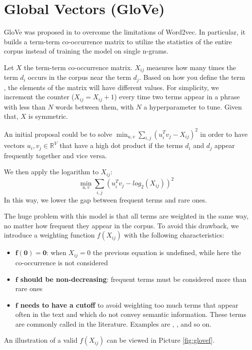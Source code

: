 \section{Global Vectors (GloVe)}

GloVe was proposed in \cite{pennington2014glove} to overcome the limitations of Word2vec.
In particular, it builds a term-term co-occurrence matrix
to utilize the statistics of the entire corpus
instead of training the model on single n-grams.

Let  $X$ the term-term co-occurrence matrix.
$X_{ij}$ measures how many times the term $d_i$ occurs in the corpus near
the term $d_j$. Based on how you define the term ,
the elements of the matrix will have different values.
For simplicity, we increment the counter ($X_{ij} = X_{ij} + 1$) every time
two terms appear in a phrase with less than $N$ words between them, with $N$ a
hyperparameter to tune. Given that, $X$ is symmetric.

An initial proposal could be to solve $ \min_{u,v} \sum_{i,j} (u_i^T v_j - X_{ij})^2$
in order to have vectors $u_i, v_j \in \mathbb{R}^V$ that have a high dot product if the terms $d_i$ and $d_j$
appear frequently together and vice versa.

We then apply the logarithm to $X_{ij}$:
\[ \displaystyle \min_{u,v} \sum_{i,j} (u_i^T v_j - log_2(X_{ij}))^2 \]
In this way, we lower the gap between frequent terms and rare ones.

The huge problem with this model is that all terms are weighted in the same way,
no matter how frequent they appear in the corpus.
To avoid this drawback, we introduce a weighting function $f(X_{ij})$ with the following characteristics:
\begin{itemize}
    \item $\boldsymbol{f(0) = 0}$: when $X_{ij} = 0$ the previous equation is undefined, while here the co-occurrence is not considered
    \item \textbf{$\boldsymbol{f}$ should be non-decreasing}: frequent terms must be considered more than rare ones
    \item \textbf{$\boldsymbol{f}$ needs to have a cutoff} to avoid weighting too much terms that appear often in the text and which do not convey semantic information.
          These terms are commonly called  in the literature. Examples are , ,  and so on.
\end{itemize}
An illustration of a valid $f(X_{ij})$ can be viewed in Picture \ref{fig:glovef}.

